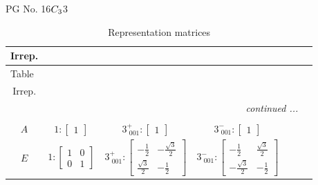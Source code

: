 \documentclass[fleqn,8pt,landscape]{jsarticle}
\begin{document}
\setcounter{MaxMatrixCols}{32}

\renewcommand{\tablename}{Table~}
\renewcommand{\figurename}{Figure~}
\begin{center}
\LARGE
PG No. 16\quad$C_{\rm 3}$\quad$3$\quad[ trigonal ]
\end{center}
\renewcommand{\arraystretch}{1.2}
\begin{longtable}{ccccccc}
\caption{Representation matrices}
 \\
 \hline \hline
Irrep. &  &  &  &  &  &  \\ \hline \endfirsthead

\multicolumn{6}{l}{\tablename\ \thetable{}} \\
 \hline \hline
Irrep. &  &  &  &  &  &  \\ \hline \endhead

 \hline \hline
\multicolumn{6}{r}{\footnotesize\it continued ...} \\ \endfoot

 \hline \hline
\multicolumn{6}{r}{} \\ \endlastfoot

$ A $ & $ 1:\begin{bmatrix} 1 \end{bmatrix} $ & $ 3^{+}_{\,\,001}:\begin{bmatrix} 1 \end{bmatrix} $ & $ 3^{-}_{\,\,001}:\begin{bmatrix} 1 \end{bmatrix} $ \\ \hline
$ E $ & $ 1:\begin{bmatrix} 1 & 0 \\ 0 & 1 \end{bmatrix} $ & $ 3^{+}_{\,\,001}:\begin{bmatrix} - \frac{1}{2} & - \frac{\sqrt{3}}{2} \\ \frac{\sqrt{3}}{2} & - \frac{1}{2} \end{bmatrix} $ & $ 3^{-}_{\,\,001}:\begin{bmatrix} - \frac{1}{2} & \frac{\sqrt{3}}{2} \\ - \frac{\sqrt{3}}{2} & - \frac{1}{2} \end{bmatrix} $ \\
\end{longtable}
\end{document}
